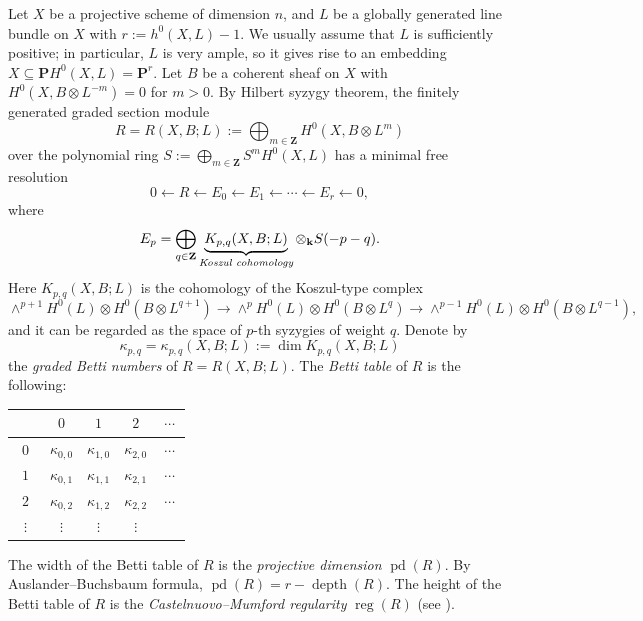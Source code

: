 \documentclass[graybox]{svmult}
\newcommand{\Z}{\mathbf{Z}}
\newcommand{\kk}{\mathbf{k}}
\def\nP{\mathbf{P}}
\def\reg{\operatorname{reg}}
\def\depth{\operatorname{depth}}
\def\pd{\operatorname{pd}}
\begin{document}
Let $X$ be a projective scheme of dimension $n$, and $L$ be a globally generated line bundle on $X$ with $r:=h^0(X, L)-1$. We usually assume that $L$ is sufficiently positive; in particular, $L$ is very ample, so it gives rise to an embedding $X \subseteq \nP H^0(X, L) = \nP^{r}$. Let $B$ be a coherent sheaf on $X$ with $H^0(X, B \otimes L^{-m})=0$ for $m > 0$. By Hilbert syzygy theorem, the finitely generated graded section module
$$
R=R(X, B; L):=\bigoplus_{m \in \Z} H^0(X, B \otimes L^m)
$$
over the polynomial ring $S:=\bigoplus_{m \in \Z} S^m H^0(X, L)$ has a minimal free resolution
$$
0 \longleftarrow R \longleftarrow E_0 \longleftarrow E_1 \longleftarrow \cdots \longleftarrow E_r \longleftarrow 0,
$$
where
$$
E_p = \bigoplus_{q \in \Z} \underbrace{K_{p,q}(X, B;L)}_{\emph{Koszul cohomology}}  \otimes_{\kk} S(-p-q).
$$
Here $K_{p,q}(X,B;L)$ is the cohomology of the Koszul-type complex
$$
\wedge^{p+1}H^0(L)\otimes H^0(B\otimes L^{q+1}) \! \rightarrow \!  \wedge^pH^0(L)\otimes H^0(B\otimes L^q) \!  \rightarrow \!  \wedge^{p-1}H^0(L)\otimes H^0(B\otimes L^{q-1}),
$$
and it can be regarded as the space of $p$-th syzygies of weight $q$. Denote by
$$
\kappa_{p,q}=\kappa_{p,q}(X, B; L):=\dim K_{p,q}(X, B; L)
$$
the \emph{graded Betti numbers} of $R=R(X,B;L)$. The \emph{Betti table} of $R$ is the following: 
\begin{center}
\begin{tabular}{c|cccc}
& $0$ & $1$ & $2$ & $~\cdots~$ \\ \hline
~$0$~ & $\kappa_{0,0}$ & $\kappa_{1,0}$ & $\kappa_{2,0}$ & $~\cdots~$  \\
~$1$~ & $\kappa_{0,1}$ & $\kappa_{1,1}$ & $\kappa_{2,1}$& $~\cdots~$  \\
~$2$~ & $\kappa_{0,2}$ & $\kappa_{1,2}$ & $\kappa_{2,2}$& $~\cdots~$  \\
$\vdots$ & $\vdots$ &  $\vdots$ & $\vdots$ &   \\ 
\end{tabular}
\end{center}
The width of the Betti table of $R$ is the \emph{projective dimension} $\pd(R)$. By Auslander--Buchsbaum formula, $\pd(R)=r-\depth(R)$. The height of the Betti table of $R$ is the \emph{Castelnuovo--Mumford regularity} $\reg(R)$ (see \cite[Subsection 1.8]{positivity}).
\end{document}
